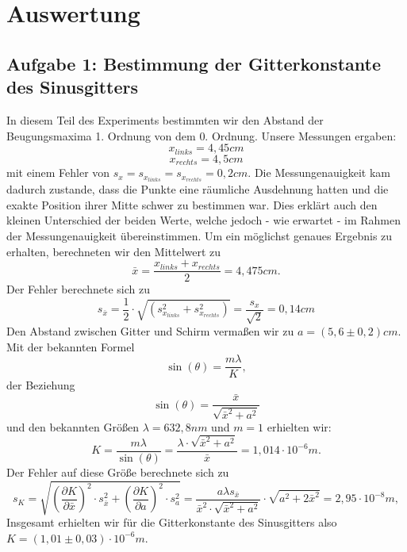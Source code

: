 \clearpage
\section{Auswertung}
\subsection{Aufgabe 1: Bestimmung der Gitterkonstante des Sinusgitters}
In diesem Teil des Experiments bestimmten wir den Abstand der Beugungsmaxima 1. Ordnung von dem 0. Ordnung. Unsere Messungen ergaben: \[x_{links}=4,45 cm\] \[x_{rechts}=4,5 cm\] mit einem Fehler von $s_{x}=s_{x_{links}}=s_{x_{rechts}}=0,2 cm$. Die Messungenauigkeit kam dadurch zustande, dass die Punkte eine räumliche Ausdehnung hatten und die exakte Position ihrer Mitte schwer zu bestimmen war. Dies erklärt auch den kleinen Unterschied der beiden Werte, welche jedoch - wie erwartet - im Rahmen der Messungenauigkeit übereinstimmen. Um ein möglichst genaues Ergebnis zu erhalten, berechneten wir den Mittelwert zu \[\bar{x}=\frac{x_{links}+x_{rechts}}{2}=4,475 cm.\] Der Fehler berechnete sich zu \[s_{\bar{x}}=\frac{1}{2}\cdot\sqrt{(s_{x_{links}}^{2}+s_{x_{rechts}}^{2})}=\frac{s_{x}}{\sqrt{2}}=0,14 cm\] Den Abstand zwischen Gitter und Schirm vermaßen wir zu $a=(5,6\pm0,2)cm$. Mit der bekannten Formel \[\sin(\theta)=\frac{m\lambda}{K},\] der Beziehung \[\sin(\theta)=\frac{\bar{x}}{\sqrt{\bar{x}^{2}+a^{2}}}\] und den bekannten Größen $\lambda=632,8 nm$ und $m=1$ erhielten wir: \[K=\frac{m\lambda}{\sin(\theta)}=\frac{\lambda\cdot\sqrt{\bar{x}^{2}+a^{2}}}{\bar{x}}= 1,014\cdot 10^{-6}m.\] Der Fehler auf diese Größe berechnete sich zu \[s_{K}=\sqrt{\left(\frac{\partial K}{\partial \bar{x}}\right)^{2}\cdot s_{\bar{x}}^{2}+\left(\frac{\partial K}{\partial a}\right)^{2}\cdot s_{a}^{2}}=\frac{a\lambda s_{\bar{x}}}{\bar{x}^{2}\cdot\sqrt{\bar{x}^{2}+a^{2}}}\cdot\sqrt{a^{2}+2\bar{x}^{2}}=2,95\cdot10^{-8}m,\] 
Insgesamt erhielten wir für die Gitterkonstante des Sinusgitters also $K=(1,01\pm0,03)\cdot10^{-6}m$.
~\\
